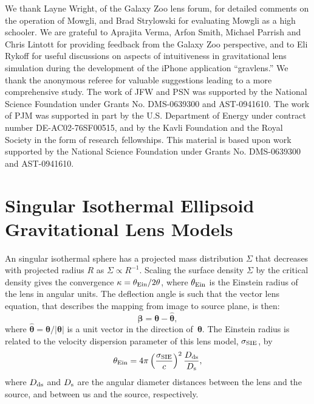 \documentclass[iop]{emulateapj}
\def\thein{\theta_{\rm Ein}}
\def\Dds{D_{\rm ds}{ }}
\def\Ds{D_{\rm s}{ }}
\def\theapplet{{\sc Mowgli}\xspace}
\begin{document}
We thank Layne Wright, of the Galaxy Zoo lens forum, 
for detailed comments on the operation of \theapplet, 
and Brad Strylowski for evaluating \theapplet as a high schooler. We are
grateful to Aprajita Verma, Arfon Smith, Michael Parrish and Chris Lintott for providing
feedback from the Galaxy Zoo perspective, and to Eli Rykoff for useful
discussions on aspects of intuitiveness in gravitational lens simulation
during the development of the iPhone application ``gravlens.'' 
% 
We thank the
anonymous referee for valuable suggestions leading to a more comprehensive
study.
%
The work of JFW and PSN was supported by the National Science
Foundation under Grants No. DMS-0639300 and AST-0941610.
% 
The work of PJM was supported in part by the U.S. Department of Energy under
contract number DE-AC02-76SF00515, and by the Kavli Foundation and the Royal
Society in the form of research fellowships.
%
This material is based upon work supported by the National Science
Foundation under Grants No. DMS-0639300 and AST-0941610.






\appendix


\section{Singular Isothermal Ellipsoid Gravitational Lens Models}

An singular isothermal sphere has a projected mass distribution $\Sigma$ that
decreases with projected radius $R$ as $\Sigma \propto R^{-1}$. Scaling the
surface density $\Sigma$ by the critical density gives the convergence 
$\kappa = \thein/2\theta$, where $\thein$ is the Einstein radius of the lens
in angular units. The deflection angle is such that the vector lens equation,
that describes the mapping from image to source plane, is then:
\begin{equation}
  \boldsymbol{\beta} = \boldsymbol{\theta} - \hat{\boldsymbol{\theta}},
\end{equation}
where $\hat{\boldsymbol{\theta}} = \boldsymbol{\theta}/|\boldsymbol{\theta}|$ is
a unit vector in the direction of~$\boldsymbol{\theta}$.
The Einstein radius is related to the velocity dispersion parameter
of this lens model,
$\sigma_{\rm SIE}$, by
\begin{equation}
  \thein = 4\pi\left(\frac{\sigma_{\rm SIE}}{c}\right)^2 \frac{\Dds}{\Ds},
\end{equation}
where $\Dds$ and $\Ds$ are the angular diameter distances between the lens and
the source, and between us and the source, respectively.
\end{document}

